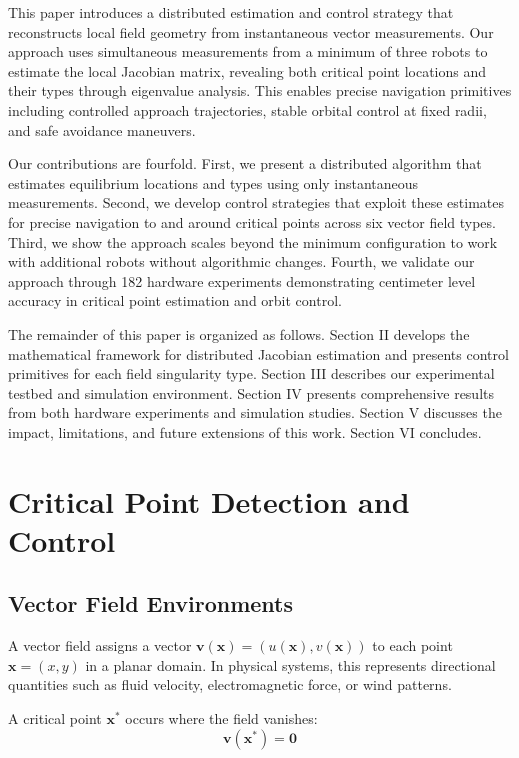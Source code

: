 \documentclass[lettersize,journal]{IEEEtran}
\begin{document}
This paper introduces a distributed estimation and control strategy that reconstructs local field geometry from instantaneous vector measurements. Our approach uses simultaneous measurements from a minimum of three robots to estimate the local Jacobian matrix, revealing both critical point locations and their types through eigenvalue analysis. This enables precise navigation primitives including controlled approach trajectories, stable orbital control at fixed radii, and safe avoidance maneuvers.

Our contributions are fourfold. First, we present a distributed algorithm that estimates equilibrium locations and types using only instantaneous measurements. Second, we develop control strategies that exploit these estimates for precise navigation to and around critical points across six vector field types. Third, we show the approach scales beyond the minimum configuration to work with additional robots without algorithmic changes. Fourth, we validate our approach through 182 hardware experiments demonstrating centimeter level accuracy in critical point estimation and orbit control.

The remainder of this paper is organized as follows. Section II develops the mathematical framework for distributed Jacobian estimation and presents control primitives for each field singularity type. Section III describes our experimental testbed and simulation environment. Section IV presents comprehensive results from both hardware experiments and simulation studies. Section V discusses the impact, limitations, and future extensions of this work. Section VI concludes.

\section{Critical Point Detection and Control}

\subsection{Vector Field Environments}

A vector field assigns a vector $\mathbf{v}(\mathbf{x}) = (u(\mathbf{x}), v(\mathbf{x}))$ to each point $\mathbf{x} = (x, y)$ in a planar domain. In physical systems, this represents directional quantities such as fluid velocity, electromagnetic force, or wind patterns.

A critical point $\mathbf{x}^*$ occurs where the field vanishes:
\begin{equation}
\mathbf{v}(\mathbf{x}^*) = \mathbf{0}
\end{equation}
\end{document}
